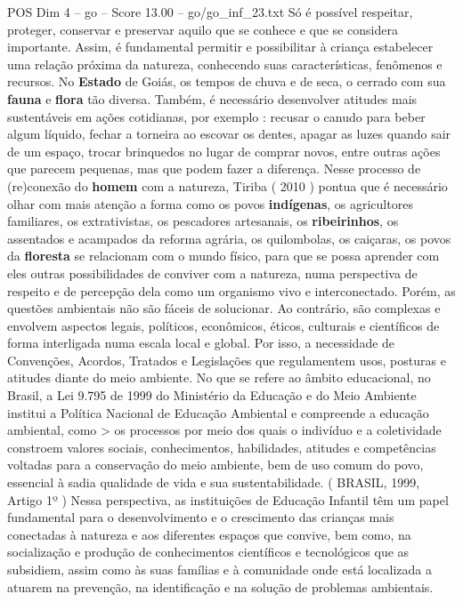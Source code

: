 \begin{textsample}{POS Dim 4 – go – Score 13.00 – go/go\_inf\_23.txt}
Só é possível respeitar, proteger, conservar e preservar aquilo que se conhece e que se considera importante.
Assim, é fundamental permitir e possibilitar à criança estabelecer uma relação próxima da natureza, conhecendo suas características, fenômenos e recursos.
No \textbf{Estado} de Goiás, os tempos de chuva e de seca, o cerrado com sua \textbf{fauna} e \textbf{flora} tão diversa.
Também, é necessário desenvolver atitudes mais sustentáveis em ações cotidianas, por exemplo : recusar o canudo para beber algum líquido, fechar a torneira ao escovar os dentes, apagar as luzes quando sair de um espaço, trocar brinquedos no lugar de comprar novos, entre outras ações que parecem pequenas, mas que podem fazer a diferença.
Nesse processo de (re)conexão do \textbf{homem} com a natureza, Tiriba ( 2010 ) pontua que é necessário olhar com mais atenção a forma como os povos \textbf{indígenas}, os agricultores familiares, os extrativistas, os pescadores artesanais, os \textbf{ribeirinhos}, os assentados e acampados da reforma agrária, os quilombolas, os caiçaras, os povos da \textbf{floresta} se relacionam com o mundo físico, para que se possa aprender com eles outras possibilidades de conviver com a natureza, numa perspectiva de respeito e de percepção dela como um organismo vivo e interconectado.
Porém, as questões ambientais não são fáceis de solucionar.
Ao contrário, são complexas e envolvem aspectos legais, políticos, econômicos, éticos, culturais e científicos de forma interligada numa escala local e global.
Por isso, a necessidade de Convenções, Acordos, Tratados e Legislações que regulamentem usos, posturas e atitudes diante do meio ambiente.
No que se refere ao âmbito educacional, no Brasil, a Lei 9.795 de 1999 do Ministério da Educação e do Meio Ambiente institui a Política Nacional de Educação Ambiental e compreende a educação ambiental, como > os processos por meio dos quais o indivíduo e a coletividade constroem valores sociais, conhecimentos, habilidades, atitudes e competências voltadas para a conservação do meio ambiente, bem de uso comum do povo, essencial à sadia qualidade de vida e sua sustentabilidade. ( BRASIL, 1999, Artigo 1º ) Nessa perspectiva, as instituições de Educação Infantil têm um papel fundamental para o desenvolvimento e o crescimento das crianças mais conectadas à natureza e aos diferentes espaços que convive, bem como, na socialização e produção de conhecimentos científicos e tecnológicos que as subsidiem, assim como às suas famílias e à comunidade onde está localizada a atuarem na prevenção, na identificação e na solução de problemas ambientais.

\end{textsample}
